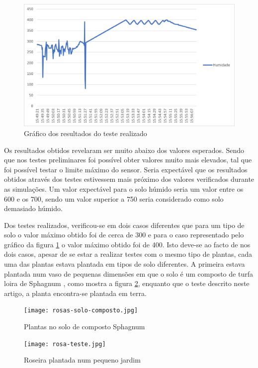 \documentclass[conference]{IEEEtran}
\begin{document}
\begin{figure}
    \centering
    \includegraphics[scale=0.5]{humidity-test-graph.png}
    \caption{Gráfico dos resultados do teste realizado}
    \label{fig:graphic}
\end{figure}

Os resultados obtidos revelaram ser muito abaixo dos valores esperados. Sendo que nos testes preliminares
foi possível obter valores muito mais elevados, tal que foi possível testar o limite máximo do sensor. Seria
expectável que os resultados obtidos através dos testes estivessem mais próximo dos valores verificados
durante as simulações. Um valor expectável para o solo húmido seria um valor entre os 600 e os 700, sendo
um valor superior a 750 seria considerado como solo demasiado húmido.

Dos testes realizados, verificou-se em dois casos diferentes que para um tipo de solo o valor máximo obtido foi
de cerca de 300 e para o caso representado pelo gráfico da figura \ref{fig:graphic} o valor máximo
obtido foi de 400.
Isto deve-se ao facto de nos dois casos, apesar de se estar a realizar testes com o mesmo tipo de plantas,
cada uma das plantas estava plantada em tipos de solo diferentes. A primeira estava plantada num vaso de
pequenas dimensões em que o solo é um composto de turfa loira de Sphagnum \cite{jardinssintra},
como mostra a figura \ref{fig:testconditions}, enquanto que o teste descrito neste artigo,
a planta encontra-se plantada em terra.

\begin{figure}[h]
    \centering
    \texttt{[image: rosas-solo-composto.jpg]}
    \caption{Plantas no solo de composto Sphagnum}
    \label{fig:testconditions}
\end{figure}

\begin{figure}[h]
    \centering
    \texttt{[image: rosa-teste.jpg]}
    \caption{Roseira plantada num pequeno jardim}
    \label{fig:roseground}
\end{figure}
\end{document}
